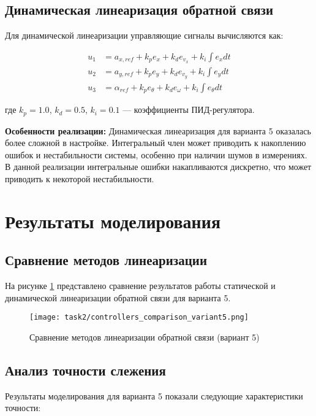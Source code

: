 \subsection{Динамическая линеаризация обратной связи}

Для динамической линеаризации управляющие сигналы вычисляются как:

\begin{align}
u_1 &= a_{x,ref} + k_p e_x + k_d e_{v_x} + k_i \int e_x dt \\
u_2 &= a_{y,ref} + k_p e_y + k_d e_{v_y} + k_i \int e_y dt \\
u_3 &= \alpha_{ref} + k_p e_\theta + k_d e_\omega + k_i \int e_\theta dt
\end{align}

где $k_p = 1.0$, $k_d = 0.5$, $k_i = 0.1$ --- коэффициенты ПИД-регулятора.

\textbf{Особенности реализации:} Динамическая линеаризация для варианта 5 оказалась более сложной в настройке. Интегральный член может приводить к накоплению ошибок и нестабильности системы, особенно при наличии шумов в измерениях. В данной реализации интегральные ошибки накапливаются дискретно, что может приводить к некоторой нестабильности.

\section{Результаты моделирования}

\subsection{Сравнение методов линеаризации}

На рисунке \ref{fig:controllers_comparison} представлено сравнение результатов работы статической и динамической линеаризации обратной связи для варианта 5.

\begin{figure}[H]
\centering
\texttt{[image: task2/controllers\_comparison\_variant5.png]}
\caption{Сравнение методов линеаризации обратной связи (вариант 5)}
\label{fig:controllers_comparison}
\end{figure}

\subsection{Анализ точности слежения}

Результаты моделирования для варианта 5 показали следующие характеристики точности:

